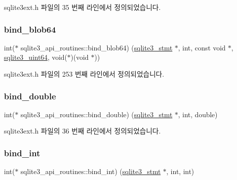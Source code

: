sqlite3ext.\+h 파일의 35 번째 라인에서 정의되었습니다.

\mbox{\label{structsqlite3__api__routines_aa34e69966762f91f4570cee3cb8f630f}} 
\subsubsection{\texorpdfstring{bind\+\_\+blob64}{bind\_blob64}}
{\footnotesize\ttfamily int($\ast$ sqlite3\+\_\+api\+\_\+routines\+::bind\+\_\+blob64) (\hyperlink{sqlite3_8h_af2a033da1327cdd77f0a174a09aedd0c}{sqlite3\+\_\+stmt} $\ast$, int, const void $\ast$, \hyperlink{sqlite3_8h_a181c20ecfd72bc6627635746d382c610}{sqlite3\+\_\+uint64}, void($\ast$)(void $\ast$))}



sqlite3ext.\+h 파일의 253 번째 라인에서 정의되었습니다.

\mbox{\label{structsqlite3__api__routines_abcdefbe78ab3ce4324d86651c03e8470}} 
\subsubsection{\texorpdfstring{bind\+\_\+double}{bind\_double}}
{\footnotesize\ttfamily int($\ast$ sqlite3\+\_\+api\+\_\+routines\+::bind\+\_\+double) (\hyperlink{sqlite3_8h_af2a033da1327cdd77f0a174a09aedd0c}{sqlite3\+\_\+stmt} $\ast$, int, double)}



sqlite3ext.\+h 파일의 36 번째 라인에서 정의되었습니다.

\mbox{\label{structsqlite3__api__routines_a70b6cc78957f11ff206df6125973daea}} 
\subsubsection{\texorpdfstring{bind\+\_\+int}{bind\_int}}
{\footnotesize\ttfamily int($\ast$ sqlite3\+\_\+api\+\_\+routines\+::bind\+\_\+int) (\hyperlink{sqlite3_8h_af2a033da1327cdd77f0a174a09aedd0c}{sqlite3\+\_\+stmt} $\ast$, int, int)}



